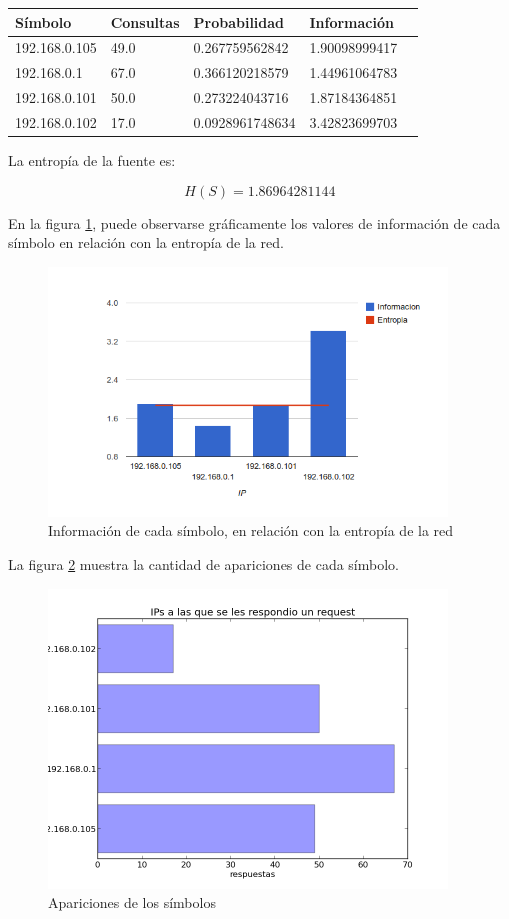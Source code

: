 \documentclass{article}
\begin{document}
\vskip10pt

\begin{tabular}{|l|l|l|l|l|}
  \hline
  Símbolo & Consultas & Probabilidad & Información \\
  \hline
  192.168.0.105 & 49.0 & 0.267759562842 & 1.90098999417\\
\hline
192.168.0.1 & 67.0 & 0.366120218579 & 1.44961064783\\
\hline
192.168.0.101 & 50.0 & 0.273224043716 & 1.87184364851\\
\hline
192.168.0.102 & 17.0 & 0.0928961748634 & 3.42823699703\\
\hline
\end{tabular}

\vskip10pt

La entropía de la fuente es:

$$H(S) = 1.86964281144$$

En la figura \ref{fig:red2replied:infoentro}, puede observarse gráficamente
los valores de información de cada símbolo en relación con la entropía de la
red.

\begin{figure}[h!]
    \centering                                                       
    \includegraphics[width=300pt]{red2/respondidas2.png}
    \caption{Información de cada símbolo, en relación con la
        entropía de la red}
    \label{fig:red2replied:infoentro}
\end{figure}

La figura \ref{fig:red2replied:count} muestra la cantidad de apariciones de
cada símbolo.

\begin{figure}[h!]
    \centering
    \includegraphics[width=300pt]{red2/red2replied.png}
    \caption{Apariciones de los símbolos}
    \label{fig:red2replied:count}
\end{figure}
\end{document}
